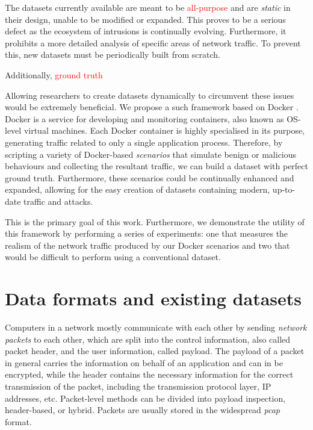 \documentclass[sigconf,anonymous]{acmart}\usepackage[]{graphicx}\usepackage[]{color}
\begin{document}
The datasets currently available are meant to be \textcolor{red}{all-purpose} and are \textit{static} in their design, unable to be modified or expanded. This proves to be a serious defect as the ecosystem of intrusions is continually evolving. Furthermore, it prohibits a more detailed analysis of specific areas of network traffic. To prevent this, new datasets must be periodically built from scratch.

Additionally, \textcolor{red}{ground truth}

Allowing researchers to create datasets dynamically to circumvent these issues would be extremely beneficial. We propose a such framework based on Docker \cite{docker}. Docker is a service for developing and monitoring containers, also known as OS-level virtual machines. Each Docker container is highly specialised in its purpose, generating traffic related to only a single application process. Therefore, by scripting a variety of Docker-based \textit{scenarios} that simulate benign or malicious behaviours and collecting the resultant traffic, we can build a dataset with perfect ground truth. Furthermore, these scenarios could be continually enhanced and expanded, allowing for the easy creation of datasets containing modern, up-to-date traffic and attacks. 



This is the primary goal of this work. Furthermore, we demonstrate the utility of this framework by performing a series of experiments: one that measures the realism of the network traffic produced by our Docker scenarios and two that would be difficult to perform using a conventional dataset.

\section{Data formats and existing datasets}

Computers in a network mostly communicate with each other by sending \textit{network packets} to each other, which are split into the control information, also called packet header, and the user information, called payload. The payload of a packet in general carries the information on behalf of an application and can in be encrypted, while the header contains the necessary information for the correct transmission of the packet, including the transmission protocol layer, IP addresses, etc. Packet-level methods can be divided into payload inspection, header-based, or hybrid. Packets are usually stored in the widespread \textit{pcap} format.
\end{document}
